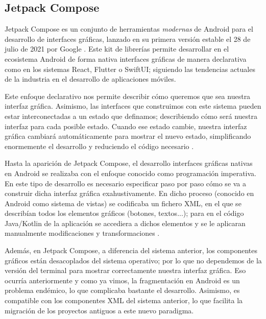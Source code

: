         \subsection{Jetpack Compose}

            Jetpack Compose es un conjunto de herramientas \textit{modernas} de Android para el desarrollo de 
            interfaces gráficas, lanzado en su primera versión estable el 28 de julio de 2021 por Google
            \cite{bellini_jetpack_2021}. Este kit de librerías permite desarrollar en el ecosistema Android de 
            forma nativa interfaces gráficas de manera declarativa como en los sistemas React, Flutter o SwiftUI;
            siguiendo las tendencias actuales de la industria en el desarrollo de aplicaciones móviles. 

            Este enfoque declarativo nos permite describir cómo queremos que sea nuestra interfaz gráfica. 
            Asimismo, las interfaces que construimos con este sistema pueden estar interconectadas a un estado 
            que definamos; describiendo cómo será nuestra interfaz para cada posible estado. Cuando ese estado cambie, 
            nuestra interfaz gráfica cambiará automáticamente para mostrar el nuevo estado, simplificando enormemente 
            el desarrollo y reduciendo el código necesario \cite{leiva_que_2021}. 

            Hasta la aparición de Jetpack Compose, el desarrollo interfaces gráficas nativas en Android se realizaba 
            con el enfoque conocido como programación imperativa. En este tipo de desarrollo es necesario especificar 
            paso por paso cómo se va a construir dicha interfaz gráfica exahustivamente. En dicho proceso (conocido 
            en Android como sistema de vistas) se codificaba un fichero XML, en el que se describían todos los 
            elementos gráficos (botones, textos...); para en el código Java/Kotlin de la aplicación se accediera 
            a dichos elementos y se le aplicaran manualmente modificaciones y transformaciones 
            \cite{noauthor_programacion_2021}. 

            Además, en Jetpack Compose, a diferencia del sistema anterior, los componentes gráficos están desacoplados 
            del sistema operativo; por lo que no dependemos de la versión del terminal para mostrar correctamente 
            nuestra interfaz gráfica. Eso ocurría anteriormente y como ya vimos, la fragmentación en Android es un 
            problema endémico, lo que complicaba bastante el desarrollo. Asimismo, es compatible con los componentes XML 
            del sistema anterior, lo que facilita la migración de los proyectos antiguos a este nuevo paradigma. 

